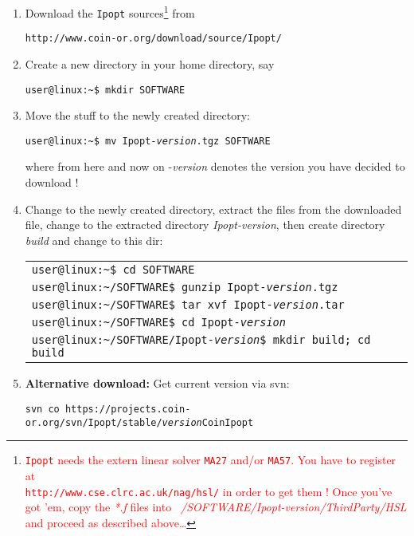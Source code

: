 \documentclass[a4paper,12pt]{article}
\makeatletter
\newcommand{\terminal}{\texttt{user@linux:\textasciitilde \$ }}
\newcommand{\tbase}{\texttt{user@linux:\textasciitilde/}}
\newcommand{\dyeitred}{\textcolor{red}}{}
\makeatother
\begin{document}
\renewcommand{\labelenumi}
  {%
    \ding{\value{local}}}
\begin{enumerate}
\item Download the \texttt{Ipopt} sources\footnote{\dyeitred{\texttt{Ipopt} needs the
  extern linear solver \texttt{MA27} and/or \texttt{MA57}. You have to
  register at \\ \texttt{http://www.cse.clrc.ac.uk/nag/hsl/} in order to get
  them ! Once you've got 'em, copy the \textit{*.f} files into
  \textit{~/SOFTWARE/Ipopt-version/ThirdParty/HSL} and proceed as described above\ldots}} from \begin{center}
  \texttt{http://www.coin-or.org/download/source/Ipopt/}
 \end{center}
\item Create a new directory in your home directory, say\begin{center}
  \texttt{\terminal mkdir SOFTWARE}
 \end{center} 
  \item Move the stuff to the newly created directory:
 \begin{center} 
 \texttt{\terminal mv  Ipopt-\textit{version}.tgz SOFTWARE}
  \end{center} 
  where from here and now on -\textit{version} denotes the version you have
  decided to download !
\item Change to the newly created directory, extract the files from
   the downloaded file, change to the extracted directory
   \textit{Ipopt-\textit{version}}, then create directory
   \textit{build} and change to this dir: 
  \begin{center}
   \begin{tabular}{l}
   \texttt{\terminal cd SOFTWARE}\\
   \texttt{\tbase SOFTWARE\$ gunzip Ipopt-\textit{version}.tgz}\\
   \texttt{\tbase SOFTWARE\$ tar xvf Ipopt-\textit{version}.tar}\\
   \texttt{\tbase SOFTWARE\$ cd Ipopt-\textit{version}} \\
   \texttt{\tbase SOFTWARE/Ipopt-\textit{version}\$ mkdir build; cd build}
    \end{tabular}
   \end{center} 
 \item \textbf{Alternative download:} Get current version via svn: \begin{center} \texttt{svn co https://projects.coin-or.org/svn/Ipopt/stable/\textit{version}\textvisiblespace CoinIpopt} \end{center} 

\end{enumerate}
\end{document}
